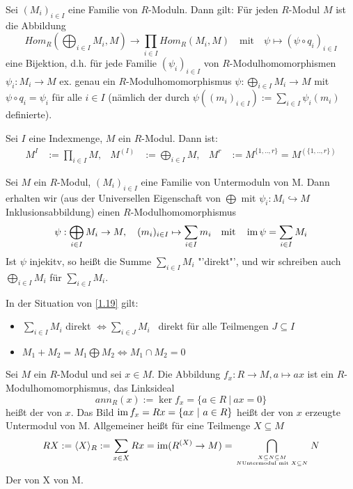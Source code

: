 \begin{sa}\label{sa1.18} Sei $(M_i)_{i \in I}$ eine Familie von $R$-Moduln. Dann gilt: Für jeden $R$-Modul $M$ ist die Abbildung $$ Hom_{R}(\bigoplus_{i \in I} M_i,M) \to \prod_{i \in I} Hom_{R}(M_i,M) \quad \text{mit} \quad \psi \mapsto (\psi \circ q_i)_{i \in I}$$
	eine Bijektion, d.h. für jede Familie $(\psi_i)_{i \in I}$ von $R$-Modulhomomorphismen $\psi_i: M_i \to M $ ex. genau ein $R$-Modulhomomorphismus $\psi: \bigoplus_{i \in I}M_i \to M$ mit $ \psi \circ q_i = \psi_i$ für alle $i \in I$ (nämlich der durch $\psi((m_i)_{i \in I}) := \sum_{i\in I} \psi_i(m_i)$ definierte).
\end{sa}
\begin{anm}
	Sei $I$ eine Indexmenge, $M$ ein $R$-Modul. Dann ist:\\
	 \begin{align*}
	 M^I &:= \prod_{i \in I}M, & M^{(I)} &:= \bigoplus_{i \in I}M, & M^{r} &:= M^{\{1,..,r\}}=M^{(\{1,..,r\})}
	 \end{align*}
\end{anm}
\begin{bem}\label{1.19}
	Sei $M$ ein $R$-Modul, $(M_i)_{i \in I}$ eine Familie von Untermoduln von M. Dann erhalten wir (aus der Universellen Eigenschaft von $\bigoplus$ mit $\psi_i:M_i\hookrightarrow M$ Inklusionsabbildung) einen $R$-Modulhomomorphismus $$ \psi:\bigoplus_{i \in I} M_i \to M, \quad (m_i)_{i \in I} \mapsto \sum_{i\in I}m_i \quad \text{mit} \quad\operatorname{im}\psi = \sum_{i\in I}M_i $$
	Ist $\psi$ injekitv, so heißt die Summe $\sum_{i\in I}M_i $ "'direkt"', und wir schreiben auch $\bigoplus_{i \in I}M_i $ für $ \sum_{i\in I}M_i$.
\end{bem}
\begin{anm} In der Situation von \ref{1.19} gilt:
	\begin{itemize}
		\item $\sum_{i\in I}M_i $ direkt $\Longleftrightarrow \sum_{i\in J}M_i $ \ direkt für alle Teilmengen $J \subseteq I$ 
		\item $M_1+M_2 = M_1 \bigoplus M_2 \Longleftrightarrow M_1 \cap M_2 =0$
	\end{itemize}
\end{anm}
\begin{df}\label{1.20}
	Sei $M$ ein $R$-Modul und sei $x \in M$. Die Abbildung $f_{x}:R \to M, a \mapsto ax$ ist ein $R$-Modulhomomorphismus, das Linksideal $$ ann_{R}(x) := \ker f_x = \{a \in R \ | \  ax=0\}$$ heißt der  von $x$. Das Bild $\operatorname{im} f_x = Rx=\{ax \ | \ a \in R\} $ heißt der von $x$ erzeugte Untermodul von M. Allgemeiner heißt für eine Teilmenge $X \subseteq M$ $$ RX := \langle X\rangle_{R} := \sum_{x\in X} Rx = \operatorname{im}(R^{(X)} \to M) = \bigcap_{X \subseteq N \subseteq M \atop N \text{Untermodul} \text{ mit } X \subseteq N}N $$
	Der von X  von M.
\end{df}
